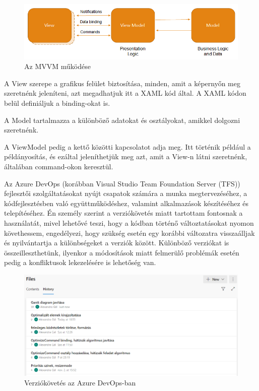 \begin{figure}[h]
	\centering
	\includegraphics[scale=0.5]{images/mvvm.png}
	\caption{Az MVVM működése}
	\label{fig:mvvm}
\end{figure}


A View szerepe a grafikus felület biztosítása, minden, amit a képernyőn meg szeretnénk jeleníteni, azt megadhatjuk itt a XAML kód által. A XAML kódon belül definiáljuk a binding-okat is.

A Model tartalmazza a különböző adatokat és osztályokat, amikkel dolgozni szeretnénk.

A ViewModel pedig a kettő közötti kapcsolatot adja meg. Itt történik például a példányosítás, és ezáltal jeleníthetjük meg azt, amit a View-n látni szeretnénk, általában command-okon keresztül.


Az Azure DevOps (korábban Visual Studio Team Foundation Server (TFS)) fejlesztői szolgáltatásokat nyújt csapatok számára a munka megtervezéséhez, a kódfejlesztésben való együttműködéshez, valamint alkalmazások készítéséhez és telepítéséhez. Én személy szerint a verziókövetés miatt tartottam fontosnak a használatát, mivel lehetővé teszi, hogy a kódban történő változtatásokat nyomon követhessem, engedélyezi, hogy szükség esetén egy korábbi változatra visszaálljak és nyilvántartja a különbségeket a verziók között. Különböző verziókat is összeilleszthetünk, ilyenkor a módosítások miatt felmerülő problémák esetén pedig a konfliktusok lekezelésére is lehetőség van.

\begin{figure}[h]
	\centering
	\includegraphics[scale=0.5]{images/azureHistory.png}
	\caption{Verziókövetés az Azure DevOps-ban}
	\label{fig:azure}
\end{figure}

